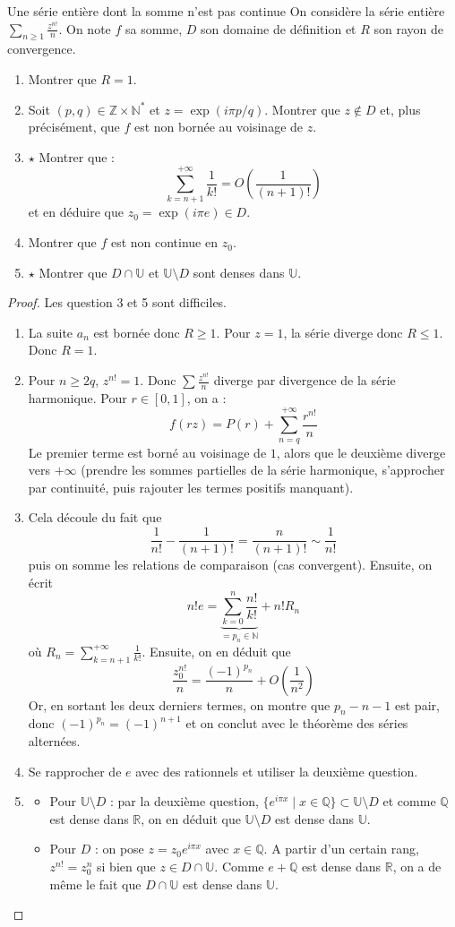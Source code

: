 \documentclass[french,a4paper]{article}
\newcommand{\N}{\mathbb{N}}
\newcommand{\Z}{\mathbb{Z}}
\newcommand{\Q}{\mathbb{Q}}
\newcommand{\R}{\mathbb{R}}
\newcommand{\U}{\mathbb{U}}
\newcommand{\st}{^*}
\theoremstyle{plain}
\theoremstyle{definition}
\theoremstyle{remark}
\begin{document}
\begin{ex}[Moulin.SE.54]{Une série entière dont la somme n'est pas continue}
	On considère la série entière $\displaystyle\sum_{n\geqslant 1}\frac{z^{n!}}{n}$. On note $f$ sa somme, $D$ son domaine de définition et $R$ son rayon de convergence.
	\begin{enumerate}
		\item Montrer que $R=1$.
		\item Soit $(p,q)\in\Z\times\N\st$ et $z=\exp(i\pi p/q)$. Montrer que $z\notin D$ et, plus précisément, que $f$ est non bornée au voisinage de $z$.
		\item $\star$ Montrer que : $$\sum_{k=n+1}^{+\infty}\frac{1}{k!}=O\left(\frac{1}{(n+1)!}\right)$$ et en déduire que $z_0=\exp(i\pi e)\in D$.
		\item Montrer que $f$ est non continue en $z_0$.
		\item $\star$ Montrer que $D\cap\U$ et $\U\setminus D$ sont denses dans $\U$.
	\end{enumerate}
\end{ex}
\begin{proof}
	Les question 3 et 5 sont difficiles.
	\begin{enumerate}
		\item La suite $a_n$ est bornée donc $R\geqslant 1$. Pour $z=1$, la série diverge donc $R\leqslant 1$. Donc $R=1$.
		\item Pour $n\geqslant 2q$, $z^{n!}=1$. Donc $\sum\frac{z^{n!}}{n}$ diverge par divergence de la série harmonique. Pour $r\in[0,1]$, on a : $$f(rz)=P(r)+\sum_{n=q}^{+\infty}\frac{r^{n!}}{n}$$ Le premier terme est borné au voisinage de $1$, alors que le deuxième diverge vers $+\infty$ (prendre les sommes partielles de la série harmonique, s'approcher par continuité, puis rajouter les termes positifs manquant).
		\item Cela découle du fait que $$\frac{1}{n!}-\frac{1}{(n+1)!}=\frac{n}{(n+1)!}\sim\frac{1}{n!}$$ puis on somme les relations de comparaison (cas convergent). Ensuite, on écrit $$n!e=\underbrace{\sum_{k=0}^{n}\frac{n!}{k!}}_{=p_n\in\N}+n!R_n$$ où $\displaystyle R_n=\sum_{k=n+1}^{+\infty}\frac{1}{k!}$. Ensuite, on en déduit que $$\frac{z_0^{n!}}{n}=\frac{(-1)^{p_n}}{n}+O\left(\frac{1}{n^2}\right)$$ Or, en sortant les deux derniers termes, on montre que $p_n-n-1$ est pair, donc $(-1)^{p_n}=(-1)^{n+1}$ et on conclut avec le théorème des séries alternées.
		\item Se rapprocher de $e$ avec des rationnels et utiliser la deuxième question.
		\item \begin{itemize}
			\item Pour $\U\setminus D$ : par la deuxième question, $\{e^{i\pi x}\mid x\in\Q\}\subset\U\setminus D$ et comme $\Q$ est dense dans $\R$, on en déduit que $\U\setminus D$ est dense dans $\U$.
			\item Pour $D$ : on pose $z=z_{0}e^{i\pi x}$ avec $x\in\Q$. A partir d'un certain rang, $z^{n!}=z_0^n$ si bien que $z\in D\cap \U$. Comme $e+\Q$ est dense dans $\R$, on a de même le fait que $D\cap\U$ est dense dans $\U$.
		\end{itemize}
	\end{enumerate}
\end{proof}
\end{document}
